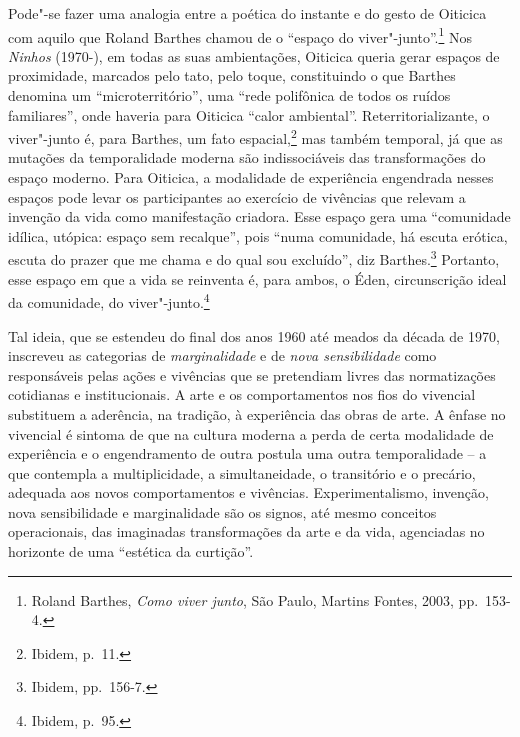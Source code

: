 Pode"-se fazer uma analogia entre a poética do instante e do gesto de
Oiticica com aquilo que Roland Barthes chamou de o ``espaço do
viver"-junto''.\footnote{Roland Barthes, \emph{Como viver junto}, São Paulo,
Martins Fontes, 2003, pp.~153-4.} Nos \emph{Ninhos} (1970-), em
todas as suas ambientações, Oiticica queria gerar espaços de
proximidade, marcados pelo tato, pelo toque, constituindo o que Barthes
denomina um ``microterritório'', uma ``rede polifônica de todos os
ruídos familiares'', onde haveria para Oiticica ``calor ambiental''.
Reterritorializante, o viver"-junto é, para Barthes, um fato
espacial,\footnote{Ibidem, p.~11.} mas também temporal, já que as
mutações da temporalidade moderna são indissociáveis das transformações
do espaço moderno. Para Oiticica, a modalidade de experiência engendrada
nesses espaços pode levar os participantes ao exercício de vivências que
relevam a invenção da vida como manifestação criadora. Esse espaço gera
uma ``comunidade idílica, utópica: espaço sem recalque'', pois ``numa
comunidade, há escuta erótica, escuta do prazer que me chama e do qual
sou excluído'', diz Barthes.\footnote{Ibidem, pp.~156-7.} Portanto, esse
espaço em que a vida se reinventa é, para ambos, o Éden, circunscrição
ideal da comunidade, do viver"-junto.\footnote{Ibidem, p.~95.}

Tal ideia, que se estendeu do final dos anos 1960 até meados da década
de 1970, inscreveu as categorias de \emph{marginalidade} e de \emph{nova
sensibilidade} como responsáveis pelas ações e vivências que se
pretendiam livres das normatizações cotidianas e institucionais. A arte
e os comportamentos nos fios do vivencial substituem a aderência, na
tradição, à experiência das obras de arte. A ênfase no vivencial é
sintoma de que na cultura moderna a perda de certa modalidade de
experiência e o engendramento de outra postula uma outra temporalidade
-- a que contempla a multiplicidade, a simultaneidade, o transitório e o
precário, adequada aos novos comportamentos e vivências.
Experimentalismo, invenção, nova sensibilidade e marginalidade são os
signos, até mesmo conceitos operacionais, das imaginadas transformações
da arte e da vida, agenciadas no horizonte de uma ``estética da
curtição''.

